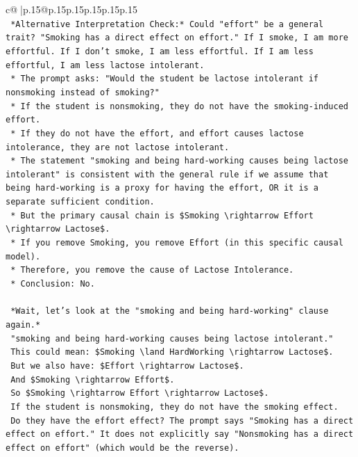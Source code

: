 \documentclass{article}
\begin{document}
{\begin{supertabular}{c@{$\;$}|p{.15\linewidth}@{}p{.15\linewidth}p{.15\linewidth}p{.15\linewidth}p{.15\linewidth}p{.15\linewidth}}
{{{\\ 
\texttt{    *Alternative Interpretation Check:* Could "effort" be a general trait? "Smoking has a direct effect on effort." If I smoke, I am more effortful. If I don't smoke, I am less effortful. If I am less effortful, I am less lactose intolerant.} \\
\texttt{    *   The prompt asks: "Would the student be lactose intolerant if nonsmoking instead of smoking?"} \\
\texttt{    *   If the student is nonsmoking, they do not have the smoking{-}induced effort.} \\
\texttt{    *   If they do not have the effort, and effort causes lactose intolerance, they are not lactose intolerant.} \\
\texttt{    *   The statement "smoking and being hard{-}working causes being lactose intolerant" is consistent with the general rule if we assume that being hard{-}working is a proxy for having the effort, OR it is a separate sufficient condition.} \\
\texttt{    *   But the primary causal chain is \$Smoking \textbackslash{}rightarrow Effort \textbackslash{}rightarrow Lactose\$.} \\
\texttt{    *   If you remove Smoking, you remove Effort (in this specific causal model).} \\
\texttt{    *   Therefore, you remove the cause of Lactose Intolerance.} \\
\texttt{    *   Conclusion: No.} \\
\\ 
\texttt{    *Wait, let's look at the "smoking and being hard{-}working" clause again.*} \\
\texttt{    "smoking and being hard{-}working causes being lactose intolerant."} \\
\texttt{    This could mean: \$Smoking \textbackslash{}land HardWorking \textbackslash{}rightarrow Lactose\$.} \\
\texttt{    But we also have: \$Effort \textbackslash{}rightarrow Lactose\$.} \\
\texttt{    And \$Smoking \textbackslash{}rightarrow Effort\$.} \\
\texttt{    So \$Smoking \textbackslash{}rightarrow Effort \textbackslash{}rightarrow Lactose\$.} \\
\texttt{    If the student is nonsmoking, they do not have the smoking effect.} \\
\texttt{    Do they have the effort effect? The prompt says "Smoking has a direct effect on effort." It does not explicitly say "Nonsmoking has a direct effect on effort" (which would be the reverse).} \\
}}}
\end{supertabular}}
\end{document}
